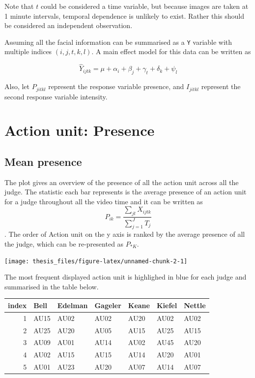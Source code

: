 \documentclass{monashthesis}
\begin{document}
Note that \(t\) could be considered a time variable, but because images are taken at 1 minute intervals, temporal dependence is unlikely to exist. Rather this should be considered an independent observation.

Assuming all the facial information can be summarised as a \texttt{Y} variable with multiple indices \((i,j,t,k,l)\). A main effect model for this data can be written as

\[\widehat{Y}_{ijtk} = \mu + \alpha_i + \beta_j + \gamma_t + \delta_k + \psi_l\]

Also, let \(P_{jitkl}\) represent the response variable presence, and \(I_{jitkl}\) represent the second response variable intensity.

\hypertarget{action-unit-presence}{%
\section{Action unit: Presence}\label{action-unit-presence}}

\hypertarget{mean-presence}{%
\subsection{Mean presence}\label{mean-presence}}

The plot gives an overview of the presence of all the action unit across all the judge. The statistic each bar represents is the average presence of an action unit for a judge throughout all the video time and it can be written as \[P_{ik} = \frac{\sum_{jt}X_{ijtk}}{\sum_{j = 1}^JT_j}\]. The order of Action unit on the y axis is ranked by the average presence of all the judge, which can be re-presented as \(P_{* K}\).

\texttt{[image: thesis\_files/figure-latex/unnamed-chunk-2-1]}

The most frequent displayed action unit is highlighed in blue for each judge and summarised in the table below.

\begin{tabular}{r|l|l|l|l|l|l}
\hline
index & Bell & Edelman & Gageler & Keane & Kiefel & Nettle\\
\hline
1 & AU15 & AU02 & AU02 & AU20 & AU02 & AU02\\
\hline
2 & AU25 & AU20 & AU05 & AU15 & AU25 & AU15\\
\hline
3 & AU09 & AU01 & AU14 & AU02 & AU45 & AU20\\
\hline
4 & AU02 & AU15 & AU15 & AU14 & AU20 & AU01\\
\hline
5 & AU01 & AU23 & AU20 & AU07 & AU14 & AU07\\
\hline
\end{tabular}
\end{document}
